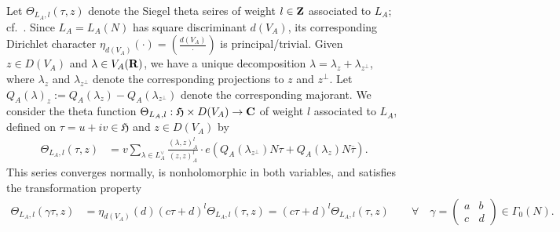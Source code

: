 \documentclass{amsart}
\theoremstyle{definition}
\theoremstyle{definition}
\theoremstyle{definition}
\begin{document}
Let $\Theta_{L_A, l}(\tau, z)$ denote the Siegel theta seires of weight $l \in {\bf{Z}}$ associated to $L_A$; cf.~\cite[$\S$2.6]{Br-123}.
Since $L_A = L_A(N)$ has square discriminant $d(V_A)$, its corresponding Dirichlet character $\eta_{d(V_A)}(\cdot) = ( \frac{d(V_A)}{\cdot} )$ is principal/trivial. 
Given $z \in D(V_A)$ and $\lambda \in V_A({\bf{R}})$, we have a unique decomposition $\lambda = \lambda_z + \lambda_{z^{\perp}}$,
where $\lambda_z$ and $\lambda_{z^{\perp}}$ denote the corresponding projections to $z$ and $z^{\perp}$.
Let $Q_A(\lambda)_z := Q_A(\lambda_z) - Q_A(\lambda_{z^{\perp}})$ denote the corresponding majorant.
We consider the theta function $\Theta_{L_A, l}: \mathfrak{H} \times D(V_A) \rightarrow {\bf{C}}$ 
of weight $l$ associated to $L_A$, defined on $\tau = u + iv \in \mathfrak{H}$ and $z \in D(V_A)$ by 
\begin{align*} \Theta_{L_A, l}(\tau, z) &= v \sum\limits_{ \lambda \in L_A^{\vee} } \frac{(\lambda, z)_A^l}{(z,z)_A^l} \cdot 
e \left( Q_A(\lambda_{z^{\perp}}) N \tau + Q_A(\lambda_{z}) N \overline{\tau} \right). \end{align*}
This series converges normally, is nonholomorphic in both variables, and satisfies the transformation property
\begin{align*} \Theta_{L_A, l}(\gamma \tau, z) &= \eta_{d(V_A)}(d) (c \tau + d)^l \Theta_{L_A, l}(\tau, z) 
= (c \tau + d)^l \Theta_{L_A, l}(\tau, z) \quad \quad \forall \quad
\gamma = \left( \begin{array}{cc} a & b \\ c & d \end{array}\right) \in \Gamma_0(N). \end{align*}
\end{document}
